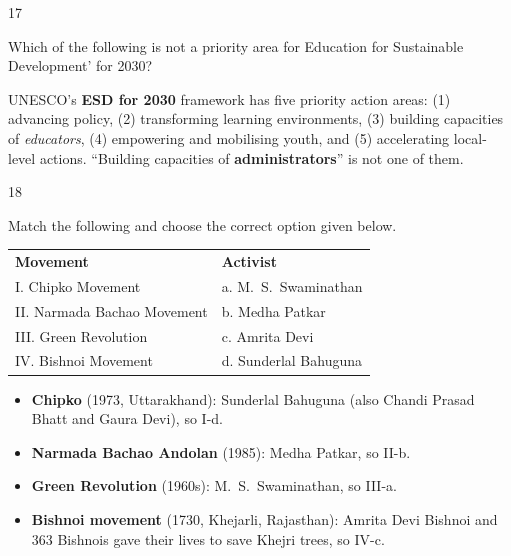 \begin{question}{17}
{Which of the following is not a priority area for Education for Sustainable Development' for 2030?\par}
\begin{explain}
UNESCO's \textbf{ESD for 2030} framework has five priority action areas: (1) advancing policy, (2) transforming learning environments, (3) building capacities of \emph{educators}, (4) empowering and mobilising youth, and (5) accelerating local-level actions. ``Building capacities of \textbf{administrators}'' is not one of them.
\end{explain}
\end{question}

\begin{question}{18}
{Match the following and choose the correct option given below.\\[2pt]
\begin{tabular}{@{}ll@{}}
\textbf{Movement} & \textbf{Activist}\\
I. Chipko Movement & a. M.~S.~Swaminathan\\
II. Narmada Bachao Movement & b. Medha Patkar\\
III. Green Revolution & c. Amrita Devi\\
IV. Bishnoi Movement & d. Sunderlal Bahuguna\\
\end{tabular}\par}
\begin{explain}
\begin{itemize}
\item \textbf{Chipko} (1973, Uttarakhand): Sunderlal Bahuguna (also Chandi Prasad Bhatt and Gaura Devi), so I-d.
\item \textbf{Narmada Bachao Andolan} (1985): Medha Patkar, so II-b.
\item \textbf{Green Revolution} (1960s): M.~S.~Swaminathan, so III-a.
\item \textbf{Bishnoi movement} (1730, Khejarli, Rajasthan): Amrita Devi Bishnoi and 363 Bishnois gave their lives to save Khejri trees, so IV-c.
\end{itemize}
\end{explain}
\end{question}


